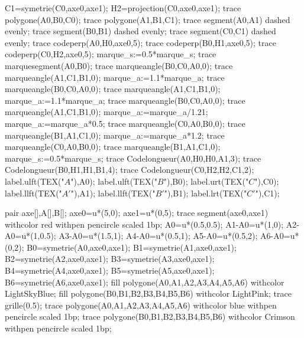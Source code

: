 \begin{changemargin}{0mm}{-15mm}
\begin{Geometrie}
        C1=symetrie(C0,axe0,axe1);
        H2=projection(C0,axe0,axe1);
        trace polygone(A0,B0,C0);
        trace polygone(A1,B1,C1);
        trace segment(A0,A1) dashed evenly;
        trace segment(B0,B1) dashed evenly;
        trace segment(C0,C1) dashed evenly;
        trace codeperp(A0,H0,axe0,5);
        trace codeperp(B0,H1,axe0,5);
        trace codeperp(C0,H2,axe0,5);
        marque_s:=0.5*marque_s;
        trace marquesegment(A0,B0);        
        trace marqueangle(B0,C0,A0,0);
        trace marqueangle(A1,C1,B1,0);
        marque_a:=1.1*marque_a;
        trace marqueangle(B0,C0,A0,0);
        trace marqueangle(A1,C1,B1,0);
        marque_a:=1.1*marque_a;        
        trace marqueangle(B0,C0,A0,0);
        trace marqueangle(A1,C1,B1,0);
        marque_a:=marque_a/1.21;
        marque_a:=marque_a*0.5;
        trace marqueangle(C0,A0,B0,0);
        trace marqueangle(B1,A1,C1,0);
        marque_a:=marque_a*1.2;
        trace marqueangle(C0,A0,B0,0);
        trace marqueangle(B1,A1,C1,0);
        marque_s:=0.5*marque_s;
        trace Codelongueur(A0,H0,H0,A1,3);
        trace Codelongueur(B0,H1,H1,B1,4);
        trace Codelongueur(C0,H2,H2,C1,2);
        label.ulft(TEX("$A$"),A0);
        label.ulft(TEX("$B$"),B0);
        label.urt(TEX("$C$"),C0);
        label.llft(TEX("$A'$"),A1);
        label.llft(TEX("$B'$"),B1);
        label.lrt(TEX("$C'$"),C1);
    \end{Geometrie}

    \begin{center}
        \begin{Geometrie}[CoinHD={(5u,5u)}]
            pair axe[],A[],B[];
            axe0=u*(5,0);
            axe1=u*(0,5);        
            trace segment(axe0,axe1) withcolor red withpen pencircle scaled 1bp;
            A0=u*(0.5,0.5);
            A1-A0=u*(1,0);
            A2-A0=u*(1,0.5);
            A3-A0=u*(1.5,1);
            A4-A0=u*(0.5,1);
            A5-A0=u*(0.5,2);
            A6-A0=u*(0,2);
            B0=symetrie(A0,axe0,axe1);
            B1=symetrie(A1,axe0,axe1);
            B2=symetrie(A2,axe0,axe1);
            B3=symetrie(A3,axe0,axe1);
            B4=symetrie(A4,axe0,axe1);
            B5=symetrie(A5,axe0,axe1);
            B6=symetrie(A6,axe0,axe1);
            fill polygone(A0,A1,A2,A3,A4,A5,A6) withcolor LightSkyBlue;
            fill polygone(B0,B1,B2,B3,B4,B5,B6) withcolor LightPink;
            trace grille(0.5);
            trace polygone(A0,A1,A2,A3,A4,A5,A6) withcolor blue withpen pencircle scaled 1bp;
            trace polygone(B0,B1,B2,B3,B4,B5,B6) withcolor Crimson withpen pencircle scaled 1bp;
        \end{Geometrie}
    \end{center}
\end{changemargin}
 